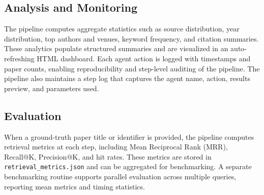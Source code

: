 \subsection{Analysis and Monitoring}
The pipeline computes aggregate statistics such as source distribution, year distribution, top authors and venues, keyword frequency, and citation summaries. These analytics populate structured summaries and are visualized in an auto-refreshing HTML dashboard. Each agent action is logged with timestamps and paper counts, enabling reproducibility and step-level auditing of the pipeline. The pipeline also maintains a step log that captures the agent name, action, results preview, and parameters used.

\subsection{Evaluation}
When a ground-truth paper title or identifier is provided, the pipeline computes retrieval metrics at each step, including Mean Reciprocal Rank (MRR), Recall@K, Precision@K, and hit rates. These metrics are stored in \texttt{retrieval\_metrics.json} and can be aggregated for benchmarking. A separate benchmarking routine supports parallel evaluation across multiple queries, reporting mean metrics and timing statistics.
